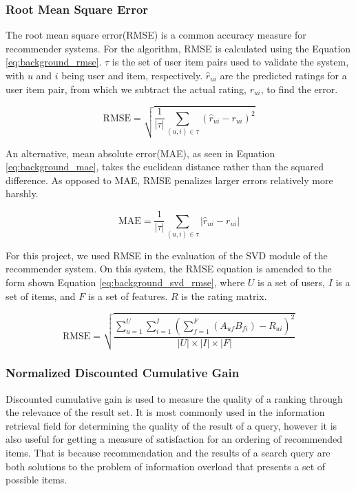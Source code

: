\subsubsection{Root Mean Square Error}
The root mean square error(RMSE) is a common accuracy measure for recommender systems\cite{rmse}. For the algorithm, RMSE is calculated using the Equation \ref{eq:background_rmse}. $\tau$ is the set of user item pairs used to validate the system, with $u$ and $i$ being user and item, respectively. $\hat{r}_{ui}$ are the predicted ratings for a user item pair, from which we subtract the actual rating, $r_{ui}$, to find the error.

\begin{equation} \label{eq:background_rmse}
\text{RMSE} = \sqrt{\frac{1}{|\tau|}\sum_{(u,i)\in \tau}(\hat{r}_{ui}-r_{ui})^2}
\end{equation}

An alternative, mean absolute error(MAE), as seen in Equation \ref{eq:background_mae}, takes the euclidean distance rather than the squared difference\cite{rmse}. As opposed to MAE, RMSE penalizes larger errors relatively more harshly.

\begin{equation} \label{eq:background_mae}
\text{MAE} = \frac{1}{|\tau|}\sum_{(u,i)\in \tau}|\hat{r}_{ui}-r_{ui}|
\end{equation}

For this project, we used RMSE in the evaluation of the SVD module of the recommender system. On this system, the RMSE equation is amended to the form shown Equation \ref{eq:background_svd_rmse}, where $U$ is a set of users, $I$ is a set of items, and $F$ is a set of features. $R$ is the rating matrix.

\begin{equation}\label{eq:background_svd_rmse}
	\text{RMSE} = \sqrt{\frac{\sum_{u=1}^{U}\sum_{i=1}^{I}(\sum_{f=1}^{F}(A_{uf} B_{fi}) - R_{ui})^2}{|U|\times |I|\times |F|}}
\end{equation}

\subsubsection{Normalized Discounted Cumulative Gain}
Discounted cumulative gain is used to measure the quality of a ranking through the relevance of the result set. It is most commonly used in the information retrieval field for determining the quality of the result of a query, however it is also useful for getting a measure of satisfaction for an ordering of recommended items. That is because recommendation and the results of a search query are both solutions to the problem of information overload that presents a set of possible items\cite{ndcg}\cite{baltrunas}.

